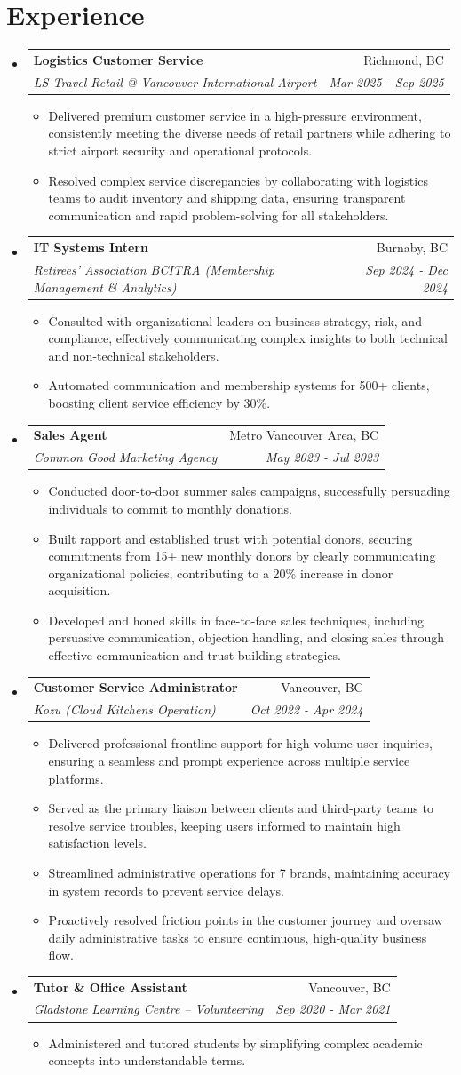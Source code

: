 \documentclass[letterpaper,11pt]{article}
\makeatletter
\newcommand{\resumeItem}[1]{
\item\small{
{#1 \vspace{-2pt}}
}
}
\newcommand{\resumeSubheading}[4]{
\vspace{-2pt}\item
\begin{tabular*}{0.97\textwidth}[t]{l@{\extracolsep{\fill}}r}
\textbf{#1} & #2 \\
\textit{\small#3} & \textit{\small #4} \\
\end{tabular*}\vspace{-7pt}
}
\newcommand{\resumeSubHeadingListStart}{\begin{itemize}[leftmargin=0.15in, label={}]}
\newcommand{\resumeSubHeadingListEnd}{\end{itemize}}
\newcommand{\resumeItemListStart}{\begin{itemize}}
\newcommand{\resumeItemListEnd}{\end{itemize}\vspace{-5pt}}
\makeatother
\begin{document}
\section{Experience}
\resumeSubHeadingListStart
\resumeSubheading{Logistics Customer Service}{Richmond, BC}{LS Travel Retail @ Vancouver International Airport}{Mar 2025 - Sep 2025}
\resumeItemListStart
\resumeItem{Delivered premium customer service in a high-pressure environment, consistently meeting the diverse needs of retail partners while adhering to strict airport security and operational protocols.}
\resumeItem{Resolved complex service discrepancies by collaborating with logistics teams to audit inventory and shipping data, ensuring transparent communication and rapid problem-solving for all stakeholders.}
\resumeItemListEnd
\resumeSubheading{IT Systems Intern}{Burnaby, BC}{Retirees' Association BCITRA (Membership Management \& Analytics)}{Sep 2024 - Dec 2024}
\resumeItemListStart
\resumeItem{Consulted with organizational leaders on business strategy, risk, and compliance, effectively communicating complex insights to both technical and non-technical stakeholders.}
\resumeItem{Automated communication and membership systems for 500+ clients, boosting client service efficiency by 30\%.}
\resumeItemListEnd
\resumeSubheading{Sales Agent}{Metro Vancouver Area, BC}{Common Good Marketing Agency}{May 2023 - Jul 2023}
\resumeItemListStart
\resumeItem{Conducted door-to-door summer sales campaigns, successfully persuading individuals to commit to monthly donations.}
\resumeItem{Built rapport and established trust with potential donors, securing commitments from 15+ new monthly donors by clearly communicating organizational policies, contributing to a 20\% increase in donor acquisition.}
\resumeItem{Developed and honed skills in face-to-face sales techniques, including persuasive communication, objection handling, and closing sales through effective communication and trust-building strategies.}
\resumeItemListEnd
\resumeSubheading{Customer Service Administrator}{Vancouver, BC}{Kozu (Cloud Kitchens Operation)}{Oct 2022 - Apr 2024}
\resumeItemListStart
\resumeItem{Delivered professional frontline support for high-volume user inquiries, ensuring a seamless and prompt experience across multiple service platforms.}
\resumeItem{Served as the primary liaison between clients and third-party teams to resolve service troubles, keeping users informed to maintain high satisfaction levels.}
\resumeItem{Streamlined administrative operations for 7 brands, maintaining accuracy in system records to prevent service delays.}
\resumeItem{Proactively resolved friction points in the customer journey and oversaw daily administrative tasks to ensure continuous, high-quality business flow.}
\resumeItemListEnd
\resumeSubheading{Tutor \& Office Assistant}{Vancouver, BC}{Gladstone Learning Centre – Volunteering}{Sep 2020 - Mar 2021}
\resumeItemListStart
\resumeItem{Administered and tutored students by simplifying complex academic concepts into understandable terms.}
\resumeItemListEnd
\resumeSubHeadingListEnd

\end{document}
